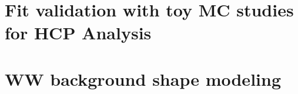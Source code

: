 \documentclass{cmspaper}
\begin{document}
%       
%       
%       
%       

\section{Fit validation with toy MC studies for HCP Analysis}
   \label{sec:appendix_fittoyshcp}
   

\clearpage
\section{WW background shape modeling}
   \label{sec:appendix_wwshape}
   




\end{document}
